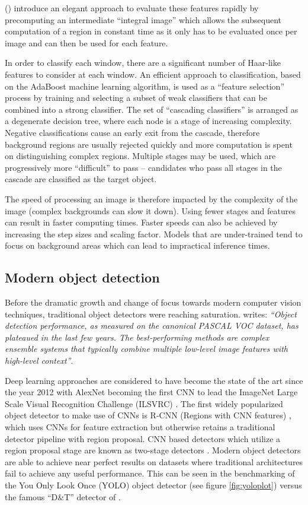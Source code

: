 \documentclass[a4paper,twoside,12pt]{report}
\begin{document}
\citeauthor{vjdet} (\citeyear{vjdet}) introduce an elegant approach to evaluate these features rapidly by precomputing an intermediate ``integral image'' which allows the subsequent computation of a region in constant time as it only has to be evaluated once per image and can then be used for each feature.

In order to classify each window, there are a significant number of Haar-like features to consider at each window. An efficient approach to classification, based on the AdaBoost machine learning algorithm, is used as a ``feature selection'' process by training and selecting a subset of weak classifiers that can be combined into a strong classifier. The set of ``cascading classifiers'' is arranged as a degenerate decision tree, where each node is a stage of increasing complexity. Negative classifications cause an early exit from the cascade, therefore background regions are usually rejected quickly and more computation is spent on distinguishing complex regions.  Multiple stages may be used, which are progressively more ``difficult'' to pass -- candidates who pass all stages in the cascade are classified as the target object.

The speed of processing an image is therefore impacted by the complexity of the image (complex backgrounds can slow it down). Using fewer stages and features can result in faster computing times. Faster speeds can also be achieved by increasing the step sizes and scaling factor. Models that are under-trained tend to focus on background areas which can lead to impractical inference times. 

\newpage
\subsection{Modern object detection}

Before the dramatic growth and change of focus towards modern computer vision techniques, traditional object detectors were reaching saturation. \cite{rcnn} writes: \textit{``Object detection performance, as measured on the canonical PASCAL VOC dataset, has plateaued in the last few years. The best-performing methods are complex ensemble systems that typically combine multiple low-level image features with high-level context''}.

Deep learning approaches are considered to have become the state of the art since the year 2012 with AlexNet becoming the first CNN to lead the ImageNet Large Scale Visual Recognition Challenge (ILSVRC) \citep{alexnet}. The first widely popularized object detector to make use of CNNs is R-CNN (Regions with CNN features) \citep{rcnn}, which uses CNNs for feature extraction but otherwise retains a traditional detector pipeline with region proposal. CNN based detectors which utilize a region proposal stage are known as two-stage detectors \citep{comprehensive}. Modern object detectors are able to achieve near perfect results on datasets where traditional architectures fail to achieve any useful performance. This can be seen in the benchmarking of the You Only Look Once (YOLO) object detector (see figure \ref{fig:yoloplot}) \citep{yolo} versus the famous ``D\&T'' detector of \cite{hog}.
\end{document}
